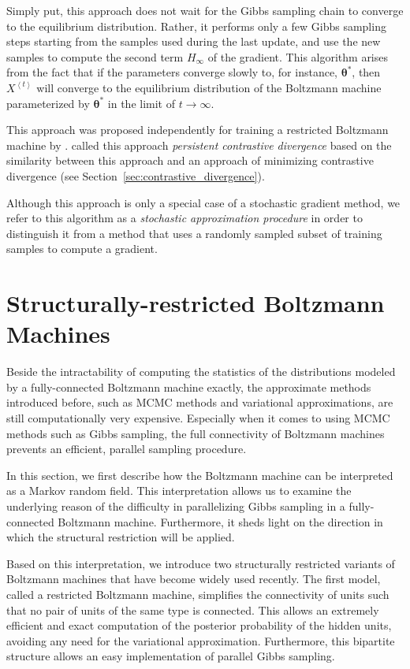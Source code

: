 \documentclass[dissertation,nocontribution,draft*]{aaltoseries}
\newcommand{\qt}[1]{\left<#1\right>}
\newcommand{\vects}[1]{\boldsymbol{#1}}
\newcommand{\TT}[0]{{\vects{\theta}}}
\begin{document}
Simply put, this approach does not wait for the Gibbs
sampling chain to converge to the equilibrium distribution.
Rather, it performs only a few Gibbs sampling steps starting
from the samples used during the last update, and use the
new samples to compute the second term $H_\infty$ of the
gradient. This algorithm arises from the fact that if the
parameters converge slowly to, for instance, $\TT^*$, then
$X^{\qt{t}}$ will converge to the equilibrium distribution of the
Boltzmann machine parameterized by $\TT^*$ in the limit of
$t \to \infty$.

This approach was proposed independently for
training a restricted Boltzmann machine by
\citet{Tieleman2008}.  \citet{Tieleman2008} called this
approach \textit{persistent contrastive divergence} based on
the similarity between this approach and an approach of
minimizing contrastive divergence (see
Section~\ref{sec:contrastive_divergence}).

Although this approach is only a special case of a
stochastic gradient method, we refer to this algorithm as a
\textit{stochastic approximation procedure} in order to
distinguish it from a method that uses a randomly sampled
subset of training samples to compute a gradient.



\section{Structurally-restricted Boltzmann Machines}
\label{sec:srbm}

Beside the intractability of computing the statistics of the
distributions modeled by a fully-connected Boltzmann machine
exactly, the approximate methods introduced before, such as
MCMC methods and variational approximations, are still
computationally very expensive. Especially when it comes to
using MCMC methods such as Gibbs sampling, the full
connectivity of Boltzmann machines prevents an efficient,
parallel sampling procedure.

In this section, we first describe how the Boltzmann machine
can be interpreted as a Markov random field. This
interpretation allows us to examine the underlying reason of
the difficulty in parallelizing Gibbs sampling in a
fully-connected Boltzmann machine. Furthermore, it sheds
light on the
direction in which the structural restriction will be applied.

Based on this interpretation, we introduce two structurally
restricted variants of Boltzmann machines that have become
widely used recently. The first model, called a restricted
Boltzmann machine, simplifies the connectivity of units such
that no pair of units of the same type is connected. This
allows an extremely efficient and exact computation of the
posterior probability of the hidden units, avoiding any need
for the variational approximation. Furthermore, this
bipartite structure allows an easy implementation of
parallel Gibbs sampling.
\end{document}
